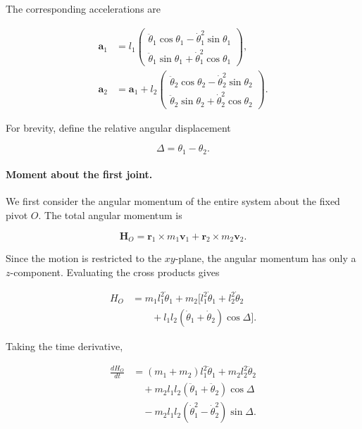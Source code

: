 The corresponding accelerations are

\begin{align}
    \mathbf{a}_1 &=
    l_1
    \begin{pmatrix}
        \ddot{\theta}_1\cos\theta_1
        -\dot{\theta}_1^2\sin\theta_1\\
        \ddot{\theta}_1\sin\theta_1
        +\dot{\theta}_1^2\cos\theta_1
    \end{pmatrix},\\
    \mathbf{a}_2 &= \mathbf{a}_1
    +l_2
    \begin{pmatrix}
        \ddot{\theta}_2\cos\theta_2
        -\dot{\theta}_2^2\sin\theta_2\\
        \ddot{\theta}_2\sin\theta_2
        +\dot{\theta}_2^2\cos\theta_2
    \end{pmatrix}.
\end{align}

For brevity, define the relative angular displacement

\begin{equation}
    \Delta=\theta_1-\theta_2.
\end{equation}

\paragraph{Moment about the first joint.}

We first consider the angular momentum of the entire system about the fixed pivot \(O\). The total angular momentum is

\begin{equation}
    \mathbf{H}_O
    =
    \mathbf{r}_1\times m_1\mathbf{v}_1
    +
    \mathbf{r}_2\times m_2\mathbf{v}_2.
\end{equation}

Since the motion is restricted to the \(xy\)-plane, the angular momentum has only a \(z\)-component. Evaluating the cross products gives

\begin{align}
    H_O
    &=
    m_1l_1^2\dot{\theta}_1
    +m_2\Big[
        l_1^2\dot{\theta}_1
        +l_2^2\dot{\theta}_2 \nonumber\\
    &\qquad
        +l_1l_2
        (\dot{\theta}_1+\dot{\theta}_2)
        \cos\Delta
    \Big].
\end{align}

Taking the time derivative,

\begin{align}
    \frac{dH_O}{dt}
    &=
    (m_1+m_2)l_1^2\ddot{\theta}_1
    +m_2l_2^2\ddot{\theta}_2 \nonumber\\
    &\quad
    +m_2l_1l_2
    (\ddot{\theta}_1+\ddot{\theta}_2)
    \cos\Delta \nonumber\\
    &\quad
    -m_2l_1l_2
    (\dot{\theta}_1^2-\dot{\theta}_2^2)
    \sin\Delta.
\end{align}

